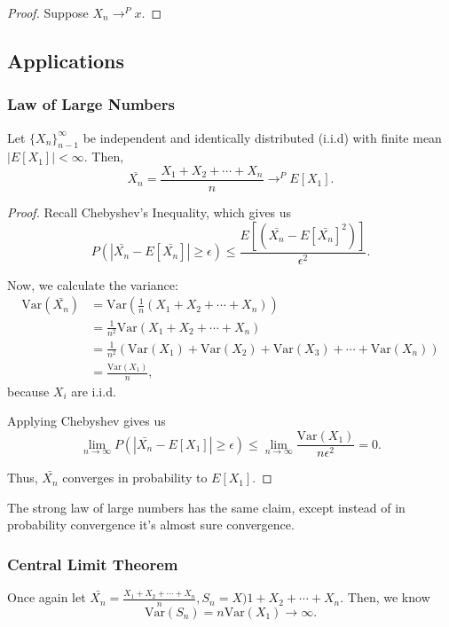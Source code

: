 \documentclass{article}
\newcommand{\Var}{\mathrm{Var}}
\begin{document}
\begin{proof}
	Suppose $X_n \to^P x$. 
\end{proof}

\subsection{Applications}
\subsubsection{Law of Large Numbers}
\begin{theorem}
	Let $\{X_n\}_{n-1}^\infty$ be independent and identically distributed (i.i.d) with finite mean $|E[X_1]| < \infty$. Then, 
	\[\overline{X_n} = \frac{X_1 + X_2 + \cdots + X_n}{n} \to^P E[X_1].\] 
\end{theorem}

\begin{proof}
	Recall Chebyshev's Inequality, which gives us \[P(|\bar{X_n} - E[\bar{X_n}]| \geq \epsilon) \leq \frac{E[(\bar{X_n} - E[\bar{X_n}]^2)]}{\epsilon^2}.\]

	Now, we calculate the variance: 
	\begin{align*} 
		\Var(\bar{X_n}) &= \Var\left(\frac{1}{n} (X_1 + X_2 + \cdots + X_n)\right) \\
		&= \frac{1}{n^2} \Var(X_1 + X_2 + \cdots + X_n) \\
		&= \frac{1}{n^2} (\Var(X_1) + \Var(X_2) + \Var(X_3) + \cdots + \Var(X_n)) \\
		&= \frac{\Var(X_1)}{n},
	\end{align*} 
	because $X_i$ are i.i.d.

	Applying Chebyshev gives us 
	\[\lim_{n \to \infty} P(|\bar{X_n} - E[X_1]| \geq \epsilon) \leq \lim_{n \to \infty} \frac{\Var(X_1)}{n \epsilon^2} = 0.\] 

	Thus, $\bar{X_n}$ converges in probability to $E[X_1]$. 
\end{proof}

The strong law of large numbers has the same claim, except instead of in probability convergence it's almost sure convergence. 

\subsubsection{Central Limit Theorem}
Once again let $\bar{X_n} = \frac{X_1 + X_2 + \cdots + X_n}{n}, S_n = X)1 + X_2 + \cdots + X_n$. Then, we know \[\Var(S_n) = n \Var(X_1) \to \infty.\]
\end{document}
